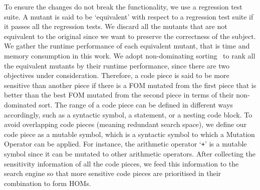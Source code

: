 \documentclass[oribibl]{llncs}
\begin{document}
To ensure the changes do not break the functionality, we use a regression test suite.
A mutant is said to be `equivalent' with respect to a regression test suite if it passes all the regression tests.
We discard all the mutants that are not equivalent to the original since we want to preserve the correctness of the subject.
We gather the runtime performance of each equivalent mutant, that is time and memory consumption in this work.
We adopt non-dominating sorting~\cite{996017} to rank all the equivalent mutants by their runtime performance, since there are two objectives under consideration.
Therefore, a code piece is said to be more sensitive than another piece if there is a FOM mutated from the first piece that is better than the best FOM mutated from the second piece in terms of their non-dominated sort.
The range of a code piece can be defined in different ways accordingly, such as a syntactic symbol, a statement, or a nesting code block.
To avoid overlapping code pieces (meaning redundant search space), we define our code piece as a mutable symbol, which is a syntactic symbol to which a Mutation Operator can be applied.
For instance, the arithmetic operator `\texttt{+}' is a mutable symbol since it can be mutated to other arithmetic operators.
After collecting the sensitivity information of all the code pieces, we feed this information to the search engine so that more sensitive code pieces are prioritised in their combination to form HOMs.
\end{document}
